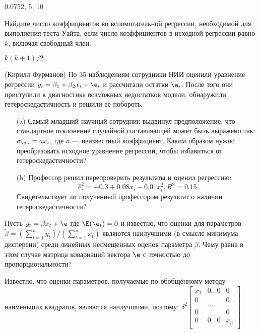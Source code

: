 \documentclass[pdftex,11pt,openany]{book}\usepackage[]{graphicx}\usepackage[]{color}
\begin{document}
\begin{solution}
$0.0752$, $5$, $10$
\end{solution}

\begin{problem}
Найдите число коэффициентов во вспомогательной регрессии, необходимой для выполнения теста Уайта, если число коэффициентов в исходной регрессии равно $k$, включая свободный член.
\end{problem}

\begin{solution}
$k(k+1)/2$
\end{solution}

\begin{problem}
(Кирилл Фурманов) По 35 наблюдениям сотрудники НИИ оценили уравнение регрессии $y_i = \beta_1 + \beta_2 x_i + \e_i$ и рассчитали остатки $\e_i$. После того они приступили к диагностике возможных недостатков модели, обнаружили гетероскедастичность и решили её побороть.
\begin{enumerate}
\item[(a)] Самый младший научный сотрудник выдвинул предположение, что стандартное отклонение случайной составляющей может быть выражено так: $\sigma_{\e, i} = a x_i$, где $a$ --– неизвестный коэффициент. Каким образом нужно преобразовать исходное уравнение регрессии, чтобы избавиться от гетероскедастичности?
\item[(b)] Профессор решил перепроверить результаты и оценил регрессию:
$$\hat{e}_i^2 = -0.3 + 0.08 x_i - 0.01 x_i^2, R^2 = 0.15$$
Свидетельствует ли полученный профессором результат о наличии гетероскедастичности?
\end{enumerate}
\end{problem}

\begin{solution}
\end{solution}


\begin{problem}
 Пусть $y_t = \beta x_t + \e$ где $\E(\e_t) = 0$ и известно, что оценки для параметров $\tilde{\beta} = \left( \sum_{t=1}^n y_t \right)/\left( \sum_{t=1}^n x_t \right)$ являются наилучшими (в смысле минимума дисперсии) среди линейных несмещенных оценок параметра $\beta$. Чему равна в этом случае матрица ковариаций вектора $\e$ с точностью до пропорциональности?
\end{problem}


\begin{solution}
Известно, что оценки параметров, получаемые по обобщённому методу наименьших квадратов, являются наилучшими, поэтому:
$\delta^2 \begin{bmatrix}
x_1 & 0\ldots0 & 0 \\
0 &  & 0 \\
  & \ldots & \\
0 &  & 0 \\
0 & 0\ldots0 & x_n \\
\end{bmatrix}$
\end{solution}
\end{document}
